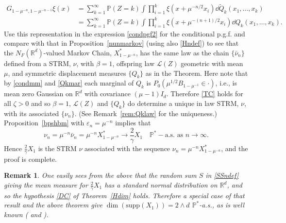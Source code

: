 \documentclass[12pt]{article}
\makeatletter
\renewenvironment{proof}[1][\proofname]{%
\par\pushQED{\qed}\normalfont%
\topsep6\p@\@plus6\p@\relax
\trivlist\item[\hskip\labelsep\bfseries#1\@addpunct{.}]%
\ignorespaces
}{%
\popQED\endtrivlist\@endpefalse
}
\numberwithin{theorem}{section}
\newtheorem{remark}[theorem]{Remark}
\theoremstyle{def}
\numberwithin{equation}{section}
\renewcommand{\P}{\mathbb{P}}
\newcommand{\R}{\mathbb{R}}
\newcommand{\cF}{\mathcal F}
\newcommand{\cL}{\mathcal{L}}
\newcommand{\veps}{\varepsilon}
\newcommand{\supp}{\mathrm{supp}}
\makeatother
\begin{document}
\begin{proof}
\begin{align*}
G_{1-\mu^{-n},1-\mu^{-n-1}}\xi(x)&=\sum_{k=1}^\infty \P(Z=k)\int\prod_{i=1}^k\xi(x+\mu^{-n/2}x_i)\dd \tilde Q_k(x_1,\dots,x_k)\\
&=\sum_{k=1}^\infty \P(Z=k)\int\prod_{i=1}^k\xi(x+\mu^{-(n+1)/2}x_i)\dd Q_k(x_1,\dots,x_k). 
\end{align*}
Use this representation in the expression \eqref{condpgf2} for the conditional p.g.f. and compare with that in
 Proposition~\ref{nunmarkov} (using also \eqref{Hndef}) to see that the $N_F(\R^d)$-valued Markov Chain, $X^*_{1-\mu^{-n}}$, has the same law as the chain $\{\bar\nu_n\}$ defined from a STRM, $\nu$, with $\beta=1$, offspring law $\cL(Z)$ geometric with mean $\mu$, and symmetric displacement measures $\{Q_k\}$ as in the Theorem.   
 Here note that by \eqref{condmm} and \eqref{Qkmar} each marginal of $Q_k$ is $P_0(\mu^{1/2}B_{1-\mu^{-1}}\in\cdot)$, i.e., is mean zero Gaussian on $\R^d$ with covariance $(\mu-1)I_d$. Therefore \ref{TC} holds for all $\zeta>0$
  and so $\beta=1$, $\cL(Z)$ and $\{Q_k\}$ do determine a unique in law STRM, $\nu$, with its associated $\{\nu_n\}$.  
  (See Remark~\ref{rem:Qklaw} for the uniqueness.) Proposition~\ref{bpshbm} with $\veps_n=\mu^{-n}$ implies that
\[\nu_n=\mu^{-n}\bar\nu_n=\mu^{-n}X^*_{1-\mu^{-n}}\to\frac{2}{\gamma}X_1\quad  \P^*-\text{a.s.}\text{ as }n\to\infty.\]
Hence $\frac{2}{\gamma}X_1$ is the STRM $\nu$ associated with the sequence $\nu_n=\mu^{-n}X^*_{1-\mu^{-n}}$, and the proof is complete.
\end{proof} 

\begin{remark}\label{SBMdim} One easily sees from the above that the random sum $S$ in \eqref{SSndef} giving the mean measure for $\frac{2}{\gamma}X_1$ has a standard normal distribution on $\R^d$, and so the hypothesis \eqref{DC} of Theorem~\ref{Hdim} holds. Therefore a special case of that result and the above theorem give $\dim(\supp(X_1))=2\wedge d$ $\P^*$-a.s., as is well known (\cite{DH79} and \cite{P89}).
\end{remark}
\end{document}
